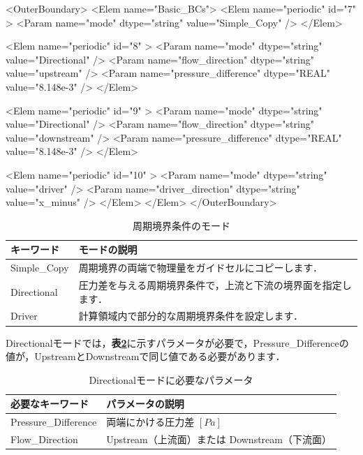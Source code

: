 {\small
\begin{program}
<OuterBoundary>
  <Elem name="Basic_BCs">
    <Elem name="periodic" id="7" >
      <Param name="mode" dtype="string" value="Simple_Copy" />
    </Elem>
      
    <Elem name="periodic" id="8" >
      <Param name="mode"                dtype="string" value="Directional" />
      <Param name="flow_direction"      dtype="string" value="upstream" />
      <Param name="pressure_difference" dtype="REAL"   value="8.148e-3" />
    </Elem>
      
    <Elem name="periodic" id="9" >
      <Param name="mode"                dtype="string" value="Directional" />
      <Param name="flow_direction"      dtype="string" value="downstream" />
      <Param name="pressure_difference" dtype="REAL"   value="8.148e-3" />
    </Elem>
      
    <Elem name="periodic" id="10" >
      <Param name="mode"             dtype="string" value="driver" />
      <Param name="driver_direction" dtype="string" value="x_minus" />
    </Elem>
  </Elem>
</OuterBoundary>
\end{program}
}

\begin{table}[htdp]
\caption{周期境界条件のモード}
\begin{center}
\small
\begin{tabular}{ll} \toprule
キーワード & モードの説明\\ \midrule
Simple\_Copy & 周期境界の両端で物理量をガイドセルにコピーします．\\
Directional  & 圧力差を与える周期境界条件で，上流と下流の境界面を指定します．\\
Driver       & 計算領域内で部分的な周期境界条件を設定します．\\ \bottomrule
\end{tabular}
\end{center}
\label{tbl:periodic mode}
\end{table}

Directionalモードでは，\textbf{表\ref{tbl:parameter dir. mode}}に示すパラメータが必要で，Pressure\_Differenceの値が，UpstreamとDownstreamで同じ値である必要があります．

\begin{table}[htdp]
\caption{Directionalモードに必要なパラメータ}
\begin{center}
\small
\begin{tabular}{ll} \toprule
必要なキーワード & パラメータの説明\\ \midrule
Pressure\_Difference & 両端にかける圧力差 $[Pa]$\\
Flow\_Direction & Upstream（上流面）または Downstream（下流面）\\
\bottomrule
\end{tabular}
\end{center}
\label{tbl:parameter dir. mode}
\end{table}



